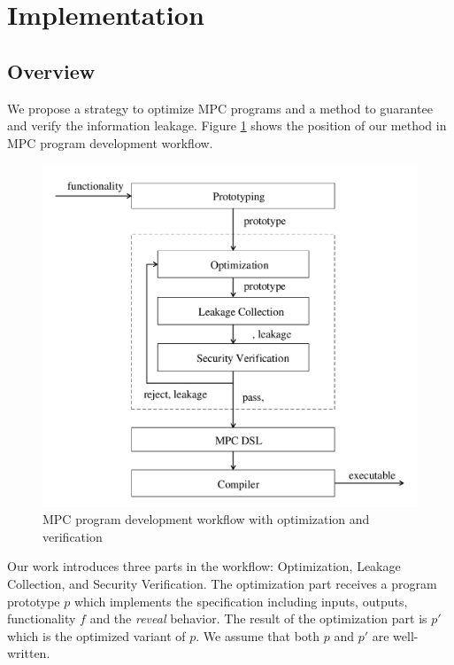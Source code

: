 \section{Implementation}

\subsection{Overview}
We propose a strategy to optimize MPC programs and a method to guarantee and verify the information leakage.
Figure \ref{workflow} shows the position of our method in MPC program development workflow.


\begin{figure}[ht]
    \centering
    \includegraphics[scale=0.4]{img/workflow.pdf}
    \caption{MPC program development workflow with optimization and verification}
    \label{workflow}
\end{figure}
Our work introduces three parts in the workflow: Optimization, Leakage Collection, and Security Verification.
The optimization part receives a program prototype $p$ which implements the specification including inputs, outputs, functionality $f$ and the \textit{reveal} behavior.
The result of the optimization part is $p'$ which is the optimized variant of $p$.
We assume that both $p$ and $p'$ are well-written.
